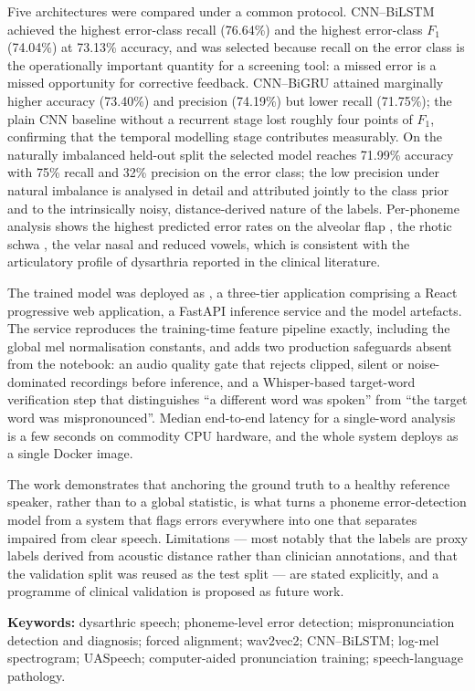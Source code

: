 Five architectures were compared under a common protocol. CNN--BiLSTM achieved
the highest error-class recall (76.64\%) and the highest error-class
$F_1$ (74.04\%) at 73.13\% accuracy, and was selected because recall on the
error class is the operationally important quantity for a screening tool: a
missed error is a missed opportunity for corrective feedback. CNN--BiGRU
attained marginally higher accuracy (73.40\%) and precision (74.19\%) but lower
recall (71.75\%); the plain CNN baseline without a recurrent stage lost roughly
four points of $F_1$, confirming that the temporal modelling stage contributes
measurably. On the naturally imbalanced held-out split the selected model
reaches 71.99\% accuracy with 75\% recall and 32\% precision on the error class;
the low precision under natural imbalance is analysed in detail and attributed
jointly to the class prior and to the intrinsically noisy, distance-derived
nature of the labels. Per-phoneme analysis shows the highest predicted error
rates on the alveolar flap , the rhotic schwa , the velar nasal
 and reduced vowels, which is consistent with the articulatory profile of
dysarthria reported in the clinical literature.

The trained model was deployed as \systemName, a three-tier application
comprising a React progressive web application, a FastAPI inference service and
the model artefacts. The service reproduces the training-time feature pipeline
exactly, including the global mel normalisation constants, and adds two
production safeguards absent from the notebook: an audio quality gate that
rejects clipped, silent or noise-dominated recordings before inference, and a
Whisper-based target-word verification step that distinguishes ``a different
word was spoken'' from ``the target word was mispronounced''. Median end-to-end
latency for a single-word analysis is a few seconds on commodity CPU hardware,
and the whole system deploys as a single Docker image.

The work demonstrates that anchoring the ground truth to a healthy reference
speaker, rather than to a global statistic, is what turns a phoneme
error-detection model from a system that flags errors everywhere into one that
separates impaired from clear speech. Limitations --- most notably that the
labels are proxy labels derived from acoustic distance rather than clinician
annotations, and that the validation split was reused as the test split ---
are stated explicitly, and a programme of clinical validation is proposed as
future work.

\vspace{0.6cm}
\noindent\textbf{Keywords:} dysarthric speech; phoneme-level error detection;
mispronunciation detection and diagnosis; forced alignment; wav2vec2;
CNN--BiLSTM; log-mel spectrogram; UASpeech; computer-aided pronunciation
training; speech-language pathology.

\clearpage
